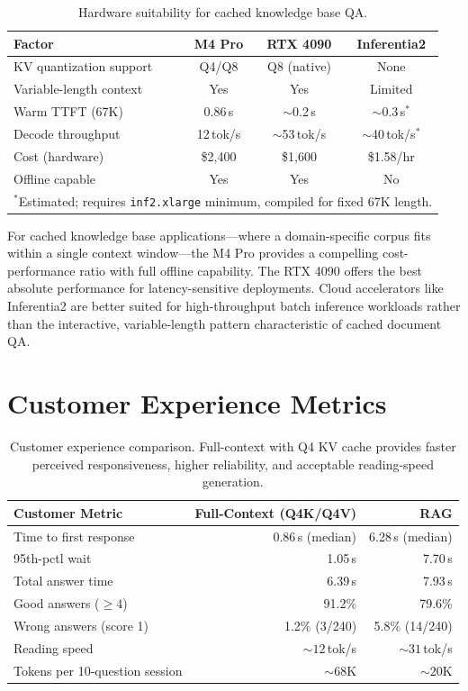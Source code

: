 \documentclass{article}
\begin{document}
\begin{table}[t]
\centering
\caption{Hardware suitability for cached knowledge base QA.}
\label{tab:hw_summary}
\small
\begin{tabular}{lccc}
\toprule
\textbf{Factor} & \textbf{M4 Pro} & \textbf{RTX 4090} & \textbf{Inferentia2} \\
\midrule
KV quantization support & Q4/Q8 & Q8 (native) & None \\
Variable-length context & Yes & Yes & Limited \\
Warm TTFT (67K) & 0.86\,s & ${\sim}$0.2\,s & ${\sim}$0.3\,s$^*$ \\
Decode throughput & 12\,tok/s & ${\sim}$53\,tok/s & ${\sim}$40\,tok/s$^*$ \\
Cost (hardware) & \$2,400 & \$1,600 & \$1.58/hr \\
Offline capable & Yes & Yes & No \\
\bottomrule
\multicolumn{4}{l}{\footnotesize $^*$Estimated; requires \texttt{inf2.xlarge} minimum, compiled for fixed 67K length.}
\end{tabular}
\end{table}

For cached knowledge base applications---where a domain-specific corpus fits
within a single context window---the M4 Pro provides a compelling
cost-performance ratio with full offline capability. The RTX 4090 offers the
best absolute performance for latency-sensitive deployments. Cloud
accelerators like Inferentia2 are better suited for high-throughput batch
inference workloads rather than the interactive, variable-length pattern
characteristic of cached document QA.

\section{Customer Experience Metrics}
\label{app:customer}

\begin{table}[t]
\centering
\caption{Customer experience comparison. Full-context with Q4 KV cache
provides faster perceived responsiveness, higher reliability, and acceptable
reading-speed generation.}
\label{tab:customer}
\begin{tabular}{lrr}
\toprule
\textbf{Customer Metric} & \textbf{Full-Context (Q4K/Q4V)} & \textbf{RAG} \\
\midrule
Time to first response          & 0.86\,s (median) & 6.28\,s (median) \\
95th-pctl wait                  & 1.05\,s & 7.70\,s \\
Total answer time               & 6.39\,s & 7.93\,s \\
Good answers ($\geq 4$)        & 91.2\% & 79.6\% \\
Wrong answers (score 1)         & 1.2\% (3/240) & 5.8\% (14/240) \\
Reading speed                   & ${\sim}12$\,tok/s & ${\sim}31$\,tok/s \\
Tokens per 10-question session  & ${\sim}68$K & ${\sim}20$K \\
\bottomrule
\end{tabular}
\end{table}
\end{document}
